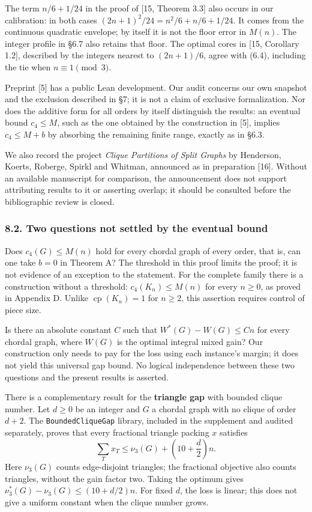 \documentclass[english,11pt,a4paper]{article}
\begin{document}
The term \(n/6+1/24\) in the proof of {[}15, Theorem 3.3{]} also occurs in our calibration: in both cases \((2n+1)^2/24=n^2/6+n/6+1/24\). It comes from the continuous quadratic envelope; by itself it is not the floor error in \(M(n)\). The integer profile in §6.7 also retains that floor. The optimal cores in {[}15, Corollary 1.2{]}, described by the integers nearest to \((2n+1)/6\), agree with (6.4), including the tie when \(n\equiv1\pmod3\).

Preprint {[}5{]} has a public Lean development. Our audit concerns our own snapshot and the exclusion described in §7; it is not a claim of exclusive formalization. Nor does the additive form for all orders by itself distinguish the results: an eventual bound \(c_4\le M\), such as the one obtained by the construction in {[}5{]}, implies \(c_4\le M+b\) by absorbing the remaining finite range, exactly as in §6.3.

We also record the project \emph{Clique Partitions of Split Graphs} by Henderson, Koerts, Roberge, Spirkl and Whitman, announced as in preparation {[}16{]}. Without an available manuscript for comparison, the announcement does not support attributing results to it or asserting overlap; it should be consulted before the bibliographic review is closed.

\subsubsection{8.2. Two questions not settled by the eventual bound}\label{two-questions-not-settled-by-the-eventual-bound}

Does \(c_4(G)\le M(n)\) hold for every chordal graph of every order, that is, can one take \(b=0\) in Theorem A? The threshold in this proof limits the proof; it is not evidence of an exception to the statement. For the complete family there is a construction without a threshold: \(c_4(K_n)\le M(n)\) for every \(n\ge0\), as proved in Appendix D. Unlike \(\operatorname{cp}(K_n)=1\) for \(n\ge2\), this assertion requires control of piece size.

Is there an absolute constant \(C\) such that \(W^*(G)-W(G)\le Cn\) for every chordal graph, where \(W(G)\) is the optimal integral mixed gain? Our construction only needs to pay for the loss using each instance's margin; it does not yield this universal gap bound. No logical independence between these two questions and the present results is asserted.

There is a complementary result for the \textbf{triangle gap} with bounded clique number. Let \(d\ge0\) be an integer and \(G\) a chordal graph with no clique of order \(d+2\). The \nolinkurl{BoundedCliqueGap} library, included in the supplement and audited separately, proves that every fractional triangle packing \(x\) satisfies \[
\sum_T x_T\le \nu_3(G)+\left(10+\frac d2\right)n.
\tag{8.1a}
\] Here \(\nu_3(G)\) counts edge-disjoint triangles; the fractional objective also counts triangles, without the gain factor two. Taking the optimum gives \(\nu_3^*(G)-\nu_3(G)\le(10+d/2)n\). For fixed \(d\), the loss is linear; this does not give a uniform constant when the clique number grows.
\end{document}
